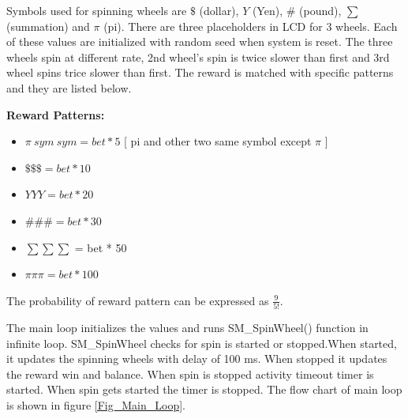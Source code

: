 \documentclass[a4paper,13pt,openany,sffamily]{memoir}
\begin{document}
\newpage
Symbols used for spinning wheels are \(\$\) (dollar), \(Y\) (Yen), \(\#\) (pound), \(\sum\) (summation) and \(\pi\) (pi). There are three placeholders in LCD for 3 wheels. Each of these values are initialized with random seed when system is reset. The three wheels spin at different rate, 2nd wheel's spin is twice slower than first and 3rd wheel spins trice slower than first. The reward is matched with specific patterns and they are listed below. 

\large \textbf {Reward Patterns:}

\begin{itemize}
\item \normalsize \( \pi\ sym\ sym = bet * 5 \)  [ pi and other two same symbol except \(\pi\) ] 
\item \( \$ \$ \$ = bet * 10 \)  
\item \( Y Y Y = bet * 20  \)
\item \( \# \# \# = bet * 30 \) 
\item \tiny \( \sum \sum \sum\) \normalsize = bet * 50
\item \normalsize \( \pi \pi \pi = bet * 100 \)   
\end{itemize}
 
The probability of reward pattern can be expressed as \( \frac{9}{5!} \).

\newpage
The main loop initializes the values and runs SM\_SpinWheel() function in infinite loop. SM\_SpinWheel checks for spin is started or stopped.When started, it updates the spinning wheels with delay of 100 ms. When stopped it updates the reward win and balance. When spin is stopped activity timeout timer is started. When spin gets started the timer is stopped. The flow chart of main loop is shown in figure \ref{Fig_Main_Loop}. 
\newlength{\textundbildtextheight}
 
\end{document}
